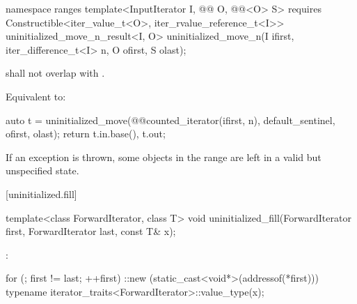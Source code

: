 \begin{addedblock}
%
\begin{itemdecl}
namespace ranges {
  template<InputIterator I, @@ O, @@<O> S>
      requires Constructible<iter_value_t<O>, iter_rvalue_reference_t<I>>
    uninitialized_move_n_result<I, O>
      uninitialized_move_n(I ifirst, iter_difference_t<I> n, O ofirst, S olast);
}
\end{itemdecl}

\begin{itemdescr}
\pnum
\expects
{} shall not overlap with
.

\pnum
\effects Equivalent to:
\begin{codeblock}
auto t = uninitialized_move(@@counted_iterator(ifirst, n),
                            default_sentinel{}, ofirst, olast);
return {t.in.base(), t.out};
\end{codeblock}

\pnum
\begin{note}
If an exception is thrown, some objects in the range
are left in a valid but unspecified state.
\end{note}
\end{itemdescr}
\end{addedblock}

[uninitialized.fill]{}

%
\begin{itemdecl}
template<class ForwardIterator, class T>
  void uninitialized_fill(ForwardIterator first, ForwardIterator last, const T& x);
\end{itemdecl}

\begin{itemdescr}
\pnum
\effects
{}:
\begin{codeblock}
for (; first != last; ++first)
  ::new (static_cast<void*>(addressof(*first)))
    typename iterator_traits<ForwardIterator>::value_type(x);
\end{codeblock}
\end{itemdescr}

